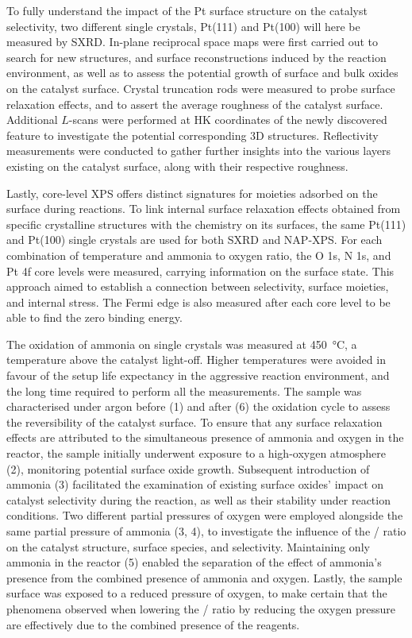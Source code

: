 To fully understand the impact of the Pt surface structure on the catalyst selectivity, two different single crystals, Pt(111) and Pt(100) will here be measured by SXRD.
In-plane reciprocal space maps were first carried out to search for new structures, and surface reconstructions induced by the reaction environment, as well as to assess the potential growth of surface and bulk oxides on the catalyst surface.
Crystal truncation rods were measured to probe surface relaxation effects, and to assert the average roughness of the catalyst surface.
Additional $L$-scans were performed at HK coordinates of the newly discovered feature to investigate the potential corresponding 3D structures.
Reflectivity measurements were conducted to gather further insights into the various layers existing on the catalyst surface, along with their respective roughness.

Lastly, core-level XPS offers distinct signatures for moieties adsorbed on the surface during reactions.
To link internal surface relaxation effects obtained from specific crystalline structures with the chemistry on its surfaces, the same Pt(111) and Pt(100) single crystals are used for both SXRD and NAP-XPS.
For each combination of temperature and ammonia to oxygen ratio, the O 1s, N 1s, and Pt 4f core levels were measured, carrying information on the surface state.
This approach aimed to establish a connection between selectivity, surface moieties, and internal stress.
The Fermi edge is also measured after each core level to be able to find the zero binding energy.

The oxidation of ammonia on single crystals was measured at \qty{450}{\degreeCelsius}, a temperature above the catalyst light-off.
Higher temperatures were avoided in favour of the setup life expectancy in the aggressive reaction environment, and the long time required to perform all the measurements.
The sample was characterised under argon before (1) and after (6) the oxidation cycle to assess the reversibility of the catalyst surface.
To ensure that any surface relaxation effects are attributed to the simultaneous presence of ammonia and oxygen in the reactor, the sample initially underwent exposure to a high-oxygen atmosphere (2), monitoring potential surface oxide growth.
Subsequent introduction of ammonia (3) facilitated the examination of existing surface oxides' impact on catalyst selectivity during the reaction, as well as their stability under reaction conditions.
Two different partial pressures of oxygen were employed alongside the same partial pressure of ammonia (3, 4), to investigate the influence of the / ratio on the catalyst structure, surface species, and selectivity.
Maintaining only ammonia in the reactor (5) enabled the separation of the effect of ammonia's presence from the combined presence of ammonia and oxygen.
Lastly, the sample surface was exposed to a reduced pressure of oxygen, to make certain that the phenomena observed when lowering the / ratio by reducing the oxygen pressure are effectively due to the combined presence of the reagents.

